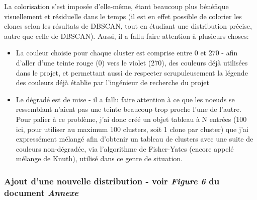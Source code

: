 \documentclass[12pt]{report}
\begin{document}
\begin{spacing}{1.2}
La colorisation s'est imposée d'elle-même, étant beaucoup plus bénéfique visuellement et résiduelle dans le temps (il est en effet possible de colorier les clones selon les résultats de DBSCAN, tout en étudiant une distribution précise, autre que celle de DBSCAN).
\newline
Aussi, il a fallu faire attention à plusieurs choses:
	\begin{itemize}
		\item{La couleur choisie pour chaque cluster est comprise entre 0 et 270 - afin d'aller d'une teinte rouge (0) vers le violet (270), des couleurs déjà utilisées dans le projet, et permettant aussi de respecter scrupuleusement la légende des couleurs déjà établie par l'ingénieur de recherche du projet}
		\item{Le dégradé est de mise - il a fallu faire attention à ce que les noeuds se ressemblant n'aient pas une teinte beaucoup trop proche l'une de l'autre.
			\newline
			Pour palier à ce problème, j'ai donc créé un objet tableau à N entrées (100 ici, pour utiliser au maximum 100 clusters, soit 1 clone par cluster) que j'ai expressément mélangé afin d'obtenir un tableau de clusters avec une suite de couleurs non-dégradée, via l'algorithme de Fisher-Yates (encore appelé mélange de Knuth), utilisé dans ce genre de situation.}
	\end{itemize}

\subsubsection{Ajout d'une nouvelle distribution - voir \textit{Figure 6} du document \textit{Annexe}}


\end{spacing}
\end{document}
